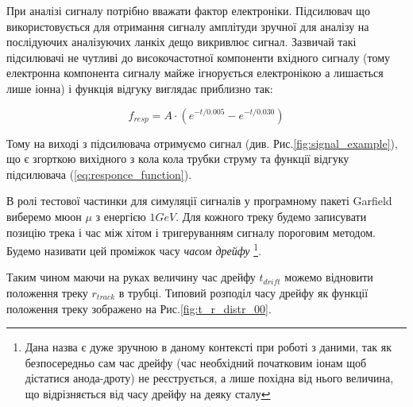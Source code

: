 \documentclass[pdftex,14pt]{scrartcl}
\begin{document}
\begin{spacing}{1.5}
	При аналізі сигналу потрібно вважати фактор електроніки. Підсилювач що використовується для отримання сигналу амплітуди зручної для аналізу на послідуючих аналізуючих ланкіх дещо викривлює сигнал. Зазвичай такі підсилювачі не чутливі до високочастотної компоненти вхідного сигналу (тому електронна компонента сигналу майже ігнорується електронікою а лишається лише іонна) і функція відгуку виглядає приблизно так:
	
	\begin{equation}
	f_{resp} =  A\cdot(e^{-t/0.005} - e^{-t/0.030})
	\label{eq:responce_function}
	\end{equation}

	Тому на виході з підсилювача отримуємо сигнал (див. Рис.\ref{fig:signal_example}), що є згорткою вихідного з кола кола трубки струму та функції відгуку підсилювача (\ref{eq:responce_function}).
	
	В ролі тестової частинки для симуляції сигналів у програмному пакеті Garfield виберемо мюон $\mu$ з енергією $1GeV$. Для кожного треку будемо записувати позицію трека і час між хітом і тригеруванням сигналу пороговим методом. Будемо називати цей проміжок часу {\it часом дрейфу} \footnote{Дана назва є дуже зручною в даному контексті при роботі з даними, так як безпосередньо сам час дрейфу (час необхідний початковим іонам щоб дістатися анода-дроту) не реєструється, а лише похідна від нього величина, що відрізняється від часу дрейфу на деяку сталу}.
	
	Таким чином маючи на руках величину час дрейфу $t_{drift}$ можемо відновити положення треку $r_{track}$ в трубці. Типовий розподіл часу дрейфу як функції положення треку зображено на Рис.\ref{fig:t_r_distr_00}.
	
	

	

\end{spacing}
\end{document}
